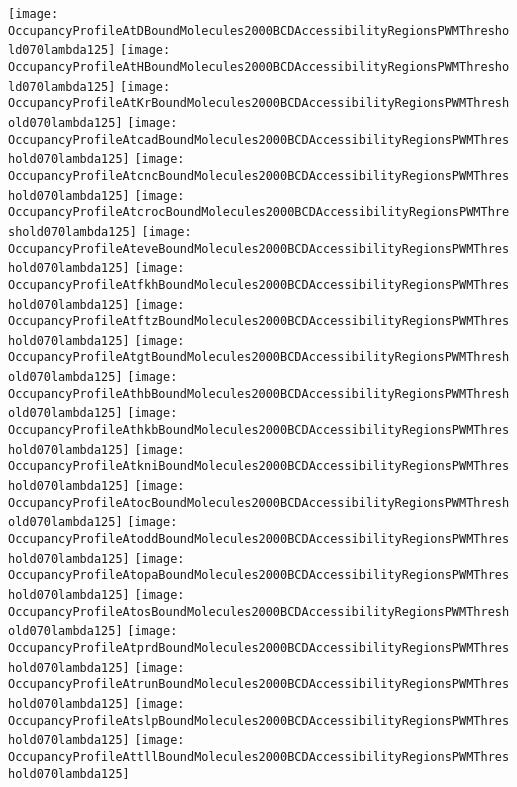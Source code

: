 \documentclass[11pt]{article}
\begin{document}
 


\begin{center}
\texttt{[image: OccupancyProfileAtDBoundMolecules2000BCDAccessibilityRegionsPWMThreshold070lambda125]}
\texttt{[image: OccupancyProfileAtHBoundMolecules2000BCDAccessibilityRegionsPWMThreshold070lambda125]}
\texttt{[image: OccupancyProfileAtKrBoundMolecules2000BCDAccessibilityRegionsPWMThreshold070lambda125]}
\texttt{[image: OccupancyProfileAtcadBoundMolecules2000BCDAccessibilityRegionsPWMThreshold070lambda125]}
\texttt{[image: OccupancyProfileAtcncBoundMolecules2000BCDAccessibilityRegionsPWMThreshold070lambda125]}
\texttt{[image: OccupancyProfileAtcrocBoundMolecules2000BCDAccessibilityRegionsPWMThreshold070lambda125]}
\texttt{[image: OccupancyProfileAteveBoundMolecules2000BCDAccessibilityRegionsPWMThreshold070lambda125]}
\texttt{[image: OccupancyProfileAtfkhBoundMolecules2000BCDAccessibilityRegionsPWMThreshold070lambda125]}
\texttt{[image: OccupancyProfileAtftzBoundMolecules2000BCDAccessibilityRegionsPWMThreshold070lambda125]}
\texttt{[image: OccupancyProfileAtgtBoundMolecules2000BCDAccessibilityRegionsPWMThreshold070lambda125]}
\texttt{[image: OccupancyProfileAthbBoundMolecules2000BCDAccessibilityRegionsPWMThreshold070lambda125]}
\texttt{[image: OccupancyProfileAthkbBoundMolecules2000BCDAccessibilityRegionsPWMThreshold070lambda125]}
\texttt{[image: OccupancyProfileAtkniBoundMolecules2000BCDAccessibilityRegionsPWMThreshold070lambda125]}
\texttt{[image: OccupancyProfileAtocBoundMolecules2000BCDAccessibilityRegionsPWMThreshold070lambda125]}
\texttt{[image: OccupancyProfileAtoddBoundMolecules2000BCDAccessibilityRegionsPWMThreshold070lambda125]}
\texttt{[image: OccupancyProfileAtopaBoundMolecules2000BCDAccessibilityRegionsPWMThreshold070lambda125]}
\texttt{[image: OccupancyProfileAtosBoundMolecules2000BCDAccessibilityRegionsPWMThreshold070lambda125]}
\texttt{[image: OccupancyProfileAtprdBoundMolecules2000BCDAccessibilityRegionsPWMThreshold070lambda125]}
\texttt{[image: OccupancyProfileAtrunBoundMolecules2000BCDAccessibilityRegionsPWMThreshold070lambda125]}
\texttt{[image: OccupancyProfileAtslpBoundMolecules2000BCDAccessibilityRegionsPWMThreshold070lambda125]}
\texttt{[image: OccupancyProfileAttllBoundMolecules2000BCDAccessibilityRegionsPWMThreshold070lambda125]}
\end{center}






\end{document}
